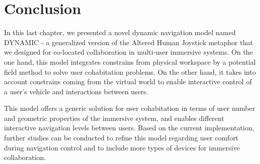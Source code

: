 \section{Conclusion}
In this last chapter, we presented a novel dynamic navigation model named DYNAMIC - a generalized version of the Altered Human Joystick metaphor that we designed for co-located collaboration in multi-user immersive systems. On the one hand, this model integrates constrains from physical workspace by a potential field method to solve user cohabitation problems. On the other hand, it takes into account constrains coming from the virtual world to enable interactive control of a user's vehicle and interactions between users.

This model offers a generic solution for user cohabitation in terms of user number and geo\-metric properties of the immersive system, and enables different interactive navigation levels between users. Based on the current implementation, further studies can be conducted to refine this model regarding user comfort during navigation control and to include more types of devices for immersive collaboration.